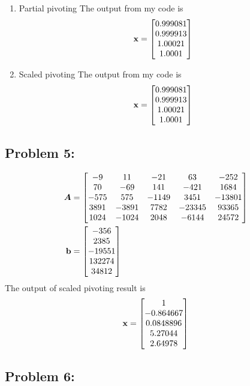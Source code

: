 \documentclass{article}
\begin{document}
\begin{enumerate}[label=(\alph*)]
\begin{enumerate}[label=(\roman*)] 
\item Partial pivoting 
The output from my code is \begin{align*} \boldsymbol{\mathrm{x}} = \begin{bmatrix} 0.999081 \\ 0.999913 \\ 1.00021 \\ 1.0001  \end{bmatrix} \end{align*} 
\item Scaled pivoting 
The output from my code is \begin{align*} \boldsymbol{\mathrm{x}} = \begin{bmatrix} 0.999081 \\ 0.999913 \\ 1.00021 \\ 1.0001  \end{bmatrix} \end{align*} 
\end{enumerate} 
\end{enumerate} 

\hypertarget{problem_0_homework_checklist_2}{}
\subsection*{{Problem 5: }}
\label{}
\begin{align*}
\boldsymbol{A} &= \begin{bmatrix} -9 & 11 & -21 & 63 & -252 \\ 
			70 & -69 & 141 & - 421 & 1684 \\
			-575 & 575 & -1149 & 3451 & -13801 \\
			3891 & -3891 & 7782 & -23345 & 93365 \\
			1024 & -1024 & 2048 & -6144 & 24572  \end{bmatrix}\\
\boldsymbol{\mathrm{b}} & = \begin{bmatrix} -356 \\ 2385 \\ -19551 \\ 132274 \\ 34812  \end{bmatrix}
\end{align*} 
The output of scaled pivoting result is \begin{align*} \boldsymbol{\mathrm{x}} = \begin{bmatrix} 1 \\ -0.864667 \\ 0.0848896 \\ 5.27044 \\ 2.64978 \end{bmatrix} \end{align*} 


\hypertarget{problem_0_homework_checklist_2}{}
\subsection*{{Problem 6: }}
\label{}
\end{document}
